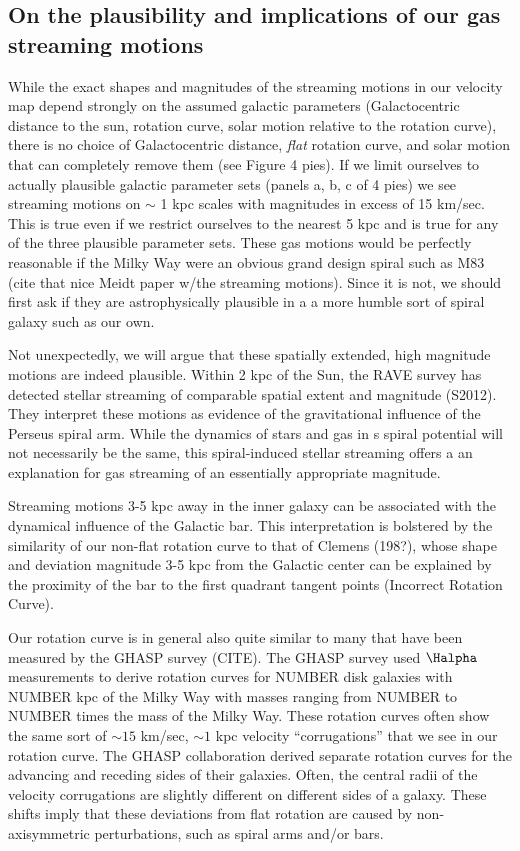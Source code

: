 \subsection{On the plausibility and implications of our gas streaming motions}
While the exact shapes and magnitudes of the streaming motions in our velocity map depend strongly on the assumed galactic parameters (Galactocentric distance to the sun, rotation curve, solar motion relative to the rotation curve), there is no choice of Galactocentric distance, \emph{flat} rotation curve, and solar motion that can completely remove them (see Figure 4 pies).
If we limit ourselves to actually plausible galactic parameter sets (panels a, b, c of 4 pies) we see streaming motions on $\sim$ 1 kpc scales with magnitudes in excess of 15 km/sec. 
This is true even if we restrict ourselves to the nearest 5 kpc and is true for any of the three plausible parameter sets. 
These gas motions would be perfectly reasonable if the Milky Way were an obvious grand design spiral such as M83 (cite that nice Meidt paper w/the streaming motions). 
Since it is not, we should first ask if they are astrophysically plausible in a a more humble sort of spiral galaxy such as our own. 

Not unexpectedly, we will argue that these spatially extended, high magnitude motions are indeed plausible.
Within 2 kpc of the Sun, the RAVE survey has detected stellar streaming of comparable spatial extent and magnitude (S2012). They interpret these motions as evidence of the gravitational influence of the Perseus spiral arm.
While the dynamics of stars and gas in s spiral potential will not necessarily be the same, this spiral-induced stellar streaming offers a an explanation for gas streaming of an essentially appropriate magnitude.

Streaming motions 3-5 kpc away in the inner galaxy can be associated with the dynamical influence of the Galactic bar. 
This interpretation is bolstered by the similarity of our non-flat rotation curve to that of Clemens (198?), whose shape and deviation magnitude 3-5 kpc from the Galactic center can be explained by the proximity of the bar to the first quadrant tangent points (Incorrect Rotation Curve). 

Our rotation curve is in general also quite similar to many that have been measured by the GHASP survey (CITE). 
The GHASP survey used $\Halpha$ measurements to derive rotation curves for NUMBER disk galaxies with NUMBER kpc of the Milky Way with masses ranging from NUMBER to NUMBER times the mass of the Milky Way.
These rotation curves often show the same sort of $\sim 15$ km/sec, $\sim 1$ kpc velocity ``corrugations'' that we see in our rotation curve. 
The GHASP collaboration derived separate rotation curves for the advancing and receding sides of their galaxies.
Often, the central radii of the velocity corrugations are slightly different on different sides of a galaxy.
These shifts imply that these deviations from flat rotation are caused by non-axisymmetric perturbations, such as spiral arms and/or bars.

